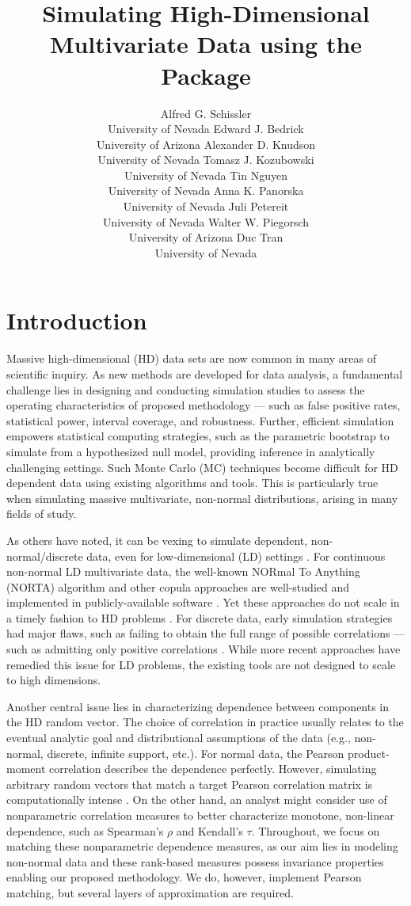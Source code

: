 \documentclass[
]{jss}
\author{
Alfred G. Schissler\\University of Nevada \And Edward J.
Bedrick\\University of Arizona \And Alexander D. Knudson\\University of
Nevada \AND Tomasz J. Kozubowski\\University of Nevada \And Tin
Nguyen\\University of Nevada \And Anna K. Panorska\\University of Nevada
\AND Juli Petereit\\University of Nevada \And Walter W.
Piegorsch\\University of Arizona \And Duc Tran\\University of Nevada
}
\title{Simulating High-Dimensional Multivariate Data using the
\pkg{Bigsimr} Package}
\begin{document}
\clearpage

\hypertarget{introduction}{%
\section{Introduction}\label{introduction}}

Massive high-dimensional (HD) data sets are now common in many areas of
scientific inquiry. As new methods are developed for data analysis, a
fundamental challenge lies in designing and conducting simulation
studies to assess the operating characteristics of proposed methodology
--- such as false positive rates, statistical power, interval coverage,
and robustness. Further, efficient simulation empowers statistical
computing strategies, such as the parametric bootstrap
\citep{Chernick2008} to simulate from a hypothesized null model,
providing inference in analytically challenging settings. Such Monte
Carlo (MC) techniques become difficult for HD dependent data using
existing algorithms and tools. This is particularly true when simulating
massive multivariate, non-normal distributions, arising in many fields
of study.

As others have noted, it can be vexing to simulate dependent,
non-normal/discrete data, even for low-dimensional (LD) settings
\citep{MB13, XZ19}. For continuous non-normal LD multivariate data, the
well-known NORmal To Anything (NORTA) algorithm \citep{Cario1997} and
other copula approaches \citep{Nelsen2007} are well-studied and
implemented in publicly-available software \citep{Yan2007, Chen2001}.
Yet these approaches do not scale in a timely fashion to HD problems
\citep{Li2019gpu}. For discrete data, early simulation strategies had
major flaws, such as failing to obtain the full range of possible
correlations --- such as admitting only positive correlations
\citep{Park1996}. While more recent approaches \citep{MB13, Xia17, BF17}
have remedied this issue for LD problems, the existing tools are not
designed to scale to high dimensions.

Another central issue lies in characterizing dependence between
components in the HD random vector. The choice of correlation in
practice usually relates to the eventual analytic goal and
distributional assumptions of the data (e.g., non-normal, discrete,
infinite support, etc.). For normal data, the Pearson product-moment
correlation describes the dependence perfectly. However, simulating
arbitrary random vectors that match a target Pearson correlation matrix
is computationally intense \citep{Chen2001, Xia17}. On the other hand,
an analyst might consider use of nonparametric correlation measures to
better characterize monotone, non-linear dependence, such as Spearman's
\(\rho\) and Kendall's \(\tau\). Throughout, we focus on matching these
nonparametric dependence measures, as our aim lies in modeling
non-normal data and these rank-based measures possess invariance
properties enabling our proposed methodology. We do, however, implement
Pearson matching, but several layers of approximation are required.
\end{document}
